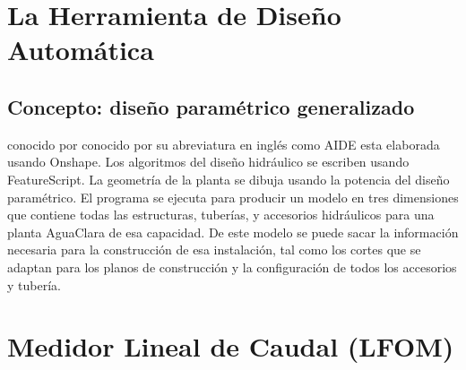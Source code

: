 \documentclass[letterpaper,10pt,spanish]{sphinxmanual}
\begin{document}
\chapter{La Herramienta de Diseño Automática}
\label{\detokenize{Introduction/AIDE_Tools:la-herramienta-de-diseno-automatica}}\label{\detokenize{Introduction/AIDE_Tools:title-la-herramienta-de-diseno-automatica}}\label{\detokenize{Introduction/AIDE_Tools::doc}}

\section{Concepto: diseño paramétrico generalizado}
\label{\detokenize{Introduction/AIDE_Tools:concepto-diseno-parametrico-generalizado}}\label{\detokenize{Introduction/AIDE_Tools:heading-concepto-diseno-parametrico-generalizadoa}}
 conocido por conocido por su abreviatura en inglés como AIDE esta elaborada usando Onshape. Los algoritmos del diseño hidráulico se escriben usando FeatureScript. La geometría de la planta se dibuja usando la potencia del diseño paramétrico. El programa se ejecuta para producir un modelo en tres dimensiones que contiene todas las estructuras, tuberías, y accesorios hidráulicos para una planta AguaClara de esa capacidad. De este modelo se puede sacar la información necesaria para la construcción de esa instalación, tal como los cortes que se adaptan para los planos de construcción y la configuración de todos los accesorios y tubería.


\chapter{Medidor Lineal de Caudal (LFOM)}
\label{\detokenize{Entrance_Tank/LFOM:medidor-lineal-de-caudal-lfom}}\label{\detokenize{Entrance_Tank/LFOM:title-lfom}}\label{\detokenize{Entrance_Tank/LFOM::doc}}
\end{document}
